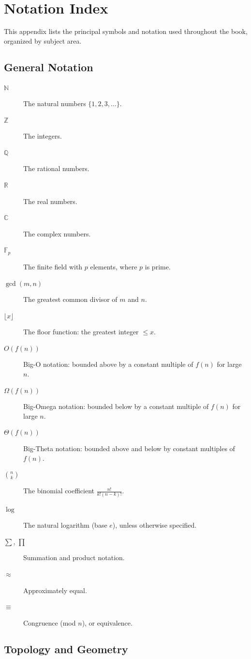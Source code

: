 \chapter{Notation Index}
\label{app:notation}

This appendix lists the principal symbols and notation used throughout the book, organized by subject area.

\section{General Notation}

\begin{description}
  \item[$\mathbb{N}$] The natural numbers $\{1, 2, 3, \ldots\}$.
  \item[$\mathbb{Z}$] The integers.
  \item[$\mathbb{Q}$] The rational numbers.
  \item[$\mathbb{R}$] The real numbers.
  \item[$\mathbb{C}$] The complex numbers.
  \item[$\mathbb{F}_p$] The finite field with $p$ elements, where $p$ is prime.
  \item[$\gcd(m,n)$] The greatest common divisor of $m$ and $n$.
  \item[$\lfloor x \rfloor$] The floor function: the greatest integer $\leq x$.
  \item[$O(f(n))$] Big-O notation: bounded above by a constant multiple of $f(n)$ for large $n$.
  \item[$\Omega(f(n))$] Big-Omega notation: bounded below by a constant multiple of $f(n)$ for large $n$.
  \item[$\Theta(f(n))$] Big-Theta notation: bounded above and below by constant multiples of $f(n)$.
  \item[$\binom{n}{k}$] The binomial coefficient $\frac{n!}{k!(n-k)!}$.
  \item[$\log$] The natural logarithm (base $e$), unless otherwise specified.
  \item[$\sum$, $\prod$] Summation and product notation.
  \item[$\approx$] Approximately equal.
  \item[$\equiv$] Congruence (mod $n$), or equivalence.
\end{description}

\section{Topology and Geometry}

